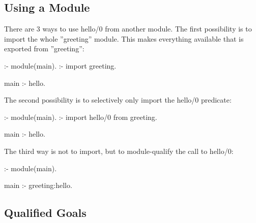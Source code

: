 \subsection{Using a Module}
There are 3 ways to use hello/0 from another module.
The first possibility is to import the whole ''greeting'' module.
This makes everything available that is exported from ''greeting'':
\begin{code}
:- module(main).
:- import greeting.

main :-
        hello.
\end{code}
The second possibility is to selectively only import the hello/0
predicate:
\begin{code}
:- module(main).
:- import hello/0 from greeting.

main :-
        hello.
\end{code}
The third way is not to import, but to module-qualify the call to hello/0:
\begin{code}
:- module(main).

main :-
        greeting:hello.
\end{code}


\subsection{Qualified Goals}

